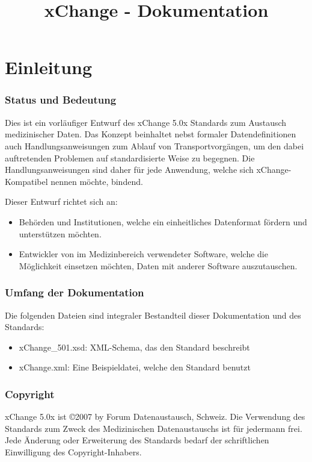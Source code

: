 \documentclass[a4paper]{scrartcl}
\begin{document}
\title{xChange - Dokumentation}
\maketitle
\tableofcontents
\part{Einleitung}
\section{Status und Bedeutung}
Dies ist ein vorläufiger Entwurf des xChange 5.0x Standards zum Austausch medizinischer Daten. Das Konzept beinhaltet nebst formaler Datendefinitionen auch Handlungsanweisungen zum Ablauf von Transportvorgängen, um den dabei auftretenden Problemen auf standardisierte Weise zu begegnen. Die Handlungsanweisungen sind daher für jede Anwendung, welche sich xChange-Kompatibel nennen möchte, bindend.

Dieser Entwurf richtet sich an:
\begin{itemize}
    \item Behörden und Institutionen, welche ein einheitliches Datenformat fördern und unterstützen möchten.
    \item Entwickler von im Medizinbereich verwendeter Software, welche die Möglichkeit einsetzen möchten, Daten mit anderer Software auszutauschen.
\end{itemize}

\section{Umfang der Dokumentation}
Die folgenden Dateien sind integraler Bestandteil dieser Dokumentation und des Standards:
\begin{itemize}
    \item xChange\_501.xsd: XML-Schema, das den Standard beschreibt
    \item xChange.xml: Eine Beispieldatei, welche den Standard benutzt
\end{itemize}

\section{Copyright}
xChange 5.0x ist \copyright 2007 by Forum Datenaustausch, Schweiz. Die Verwendung des Standards zum Zweck des Medizinischen Datenaustauschs ist für jedermann frei.
Jede Änderung oder Erweiterung des Standards bedarf der schriftlichen Einwilligung des Copyright-Inhabers.
\end{document}
